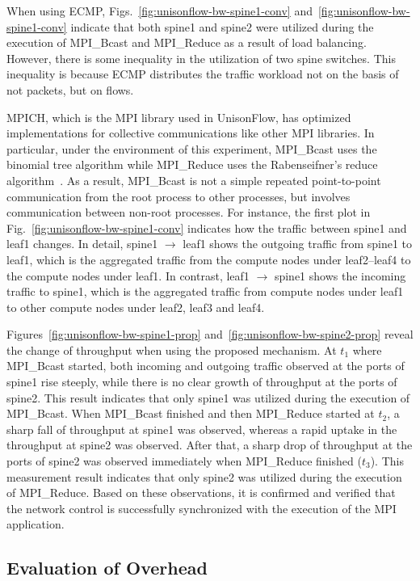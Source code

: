 When using ECMP, Figs.~\ref{fig:unisonflow-bw-spine1-conv}
and~\ref{fig:unisonflow-bw-spine1-conv} indicate that both spine1 and spine2
were utilized during the execution of MPI\_Bcast and MPI\_Reduce as a result
of load balancing. However, there is some inequality in the utilization of two
spine switches. This inequality is because ECMP distributes the traffic
workload not on the basis of not packets, but on flows.

MPICH, which is the MPI library used in UnisonFlow, has optimized
implementations for collective communications like other MPI libraries.
In particular, under the environment of this experiment, MPI\_Bcast uses
the binomial tree algorithm while MPI\_Reduce uses the Rabenseifner's reduce
algorithm~\autocite{Rabenseifner2004}. As a result, MPI\_Bcast is not a
simple repeated point-to-point communication from the root process to
other processes, but involves communication between non-root processes. For
instance, the first plot in Fig.~\ref{fig:unisonflow-bw-spine1-conv} indicates
how the traffic between spine1 and leaf1 changes. In detail, spine1 $\to$
leaf1 shows the outgoing traffic from spine1 to leaf1, which is the aggregated
traffic from the compute nodes under leaf2--leaf4 to the compute nodes under
leaf1. In contrast, leaf1 $\to$ spine1 shows the incoming traffic to spine1,
which is the aggregated traffic from compute nodes under leaf1 to other
compute nodes under leaf2, leaf3 and leaf4.

Figures~\ref{fig:unisonflow-bw-spine1-prop}
and~\ref{fig:unisonflow-bw-spine2-prop} reveal the change of throughput when
using the proposed mechanism. At \(t_1\) where MPI\_Bcast started, both
incoming and outgoing traffic observed at the ports of spine1 rise steeply,
while there is no clear growth of throughput at the ports of spine2. This
result indicates that only spine1 was utilized during the execution of
MPI\_Bcast. When MPI\_Bcast finished and then MPI\_Reduce started at \(t_2\),
a sharp fall of throughput at spine1 was observed, whereas a rapid uptake in
the throughput at spine2 was observed. After that, a sharp drop of throughput
at the ports of spine2 was observed immediately when MPI\_Reduce finished
(\(t_3\)). This measurement result indicates that only spine2 was utilized
during the execution of MPI\_Reduce. Based on these observations, it is
confirmed and verified that the network control is successfully synchronized
with the execution of the MPI application.

\subsection{Evaluation of Overhead}

